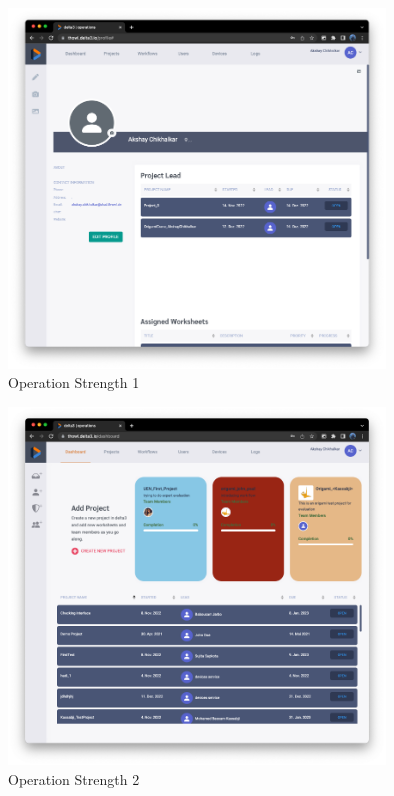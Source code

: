 \documentclass[conference,onecolumn]{IEEEtran}
\begin{document}
    \begin{figure}[H]
        \centerline{\includegraphics[width=100mm,scale=1]{./images/Operation_Strength_1.png}}
        \caption{Operation Strength 1}
        \label{Operation Strength 1}
    \end{figure}  
    \begin{figure}[H]
        \centerline{\includegraphics[width=100mm,scale=1]{./images/Operation_Strength_2.png}}
        \caption{Operation Strength 2}
        \label{Operation Strength 2}
    \end{figure}  
\end{document}
